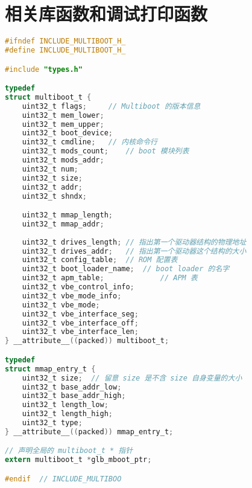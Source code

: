
\section {相关库函数和调试打印函数}


\begin{lstlisting}[language = C, label = include/multiboot.h, caption = include/multiboot.h]
#ifndef INCLUDE_MULTIBOOT_H_
#define INCLUDE_MULTIBOOT_H_

#include "types.h"

typedef
struct multiboot_t {
	uint32_t flags;		// Multiboot 的版本信息
	uint32_t mem_lower;
	uint32_t mem_upper;
	uint32_t boot_device;
	uint32_t cmdline;	// 内核命令行
	uint32_t mods_count;	// boot 模块列表
	uint32_t mods_addr;
	uint32_t num;
	uint32_t size;
	uint32_t addr;
	uint32_t shndx;

	uint32_t mmap_length;		
	uint32_t mmap_addr;
	
	uint32_t drives_length; // 指出第一个驱动器结构的物理地址	
	uint32_t drives_addr; 	// 指出第一个驱动器这个结构的大小
	uint32_t config_table; 	// ROM 配置表
	uint32_t boot_loader_name; 	// boot loader 的名字
	uint32_t apm_table; 	    	// APM 表
	uint32_t vbe_control_info;
	uint32_t vbe_mode_info;
	uint32_t vbe_mode;
	uint32_t vbe_interface_seg;
	uint32_t vbe_interface_off;
	uint32_t vbe_interface_len;
} __attribute__((packed)) multiboot_t;

typedef
struct mmap_entry_t {
	uint32_t size; 	// 留意 size 是不含 size 自身变量的大小
	uint32_t base_addr_low;
	uint32_t base_addr_high;
	uint32_t length_low;
	uint32_t length_high;
	uint32_t type;
} __attribute__((packed)) mmap_entry_t;

// 声明全局的 multiboot_t * 指针
extern multiboot_t *glb_mboot_ptr;

#endif 	// INCLUDE_MULTIBOO
\end{lstlisting}
